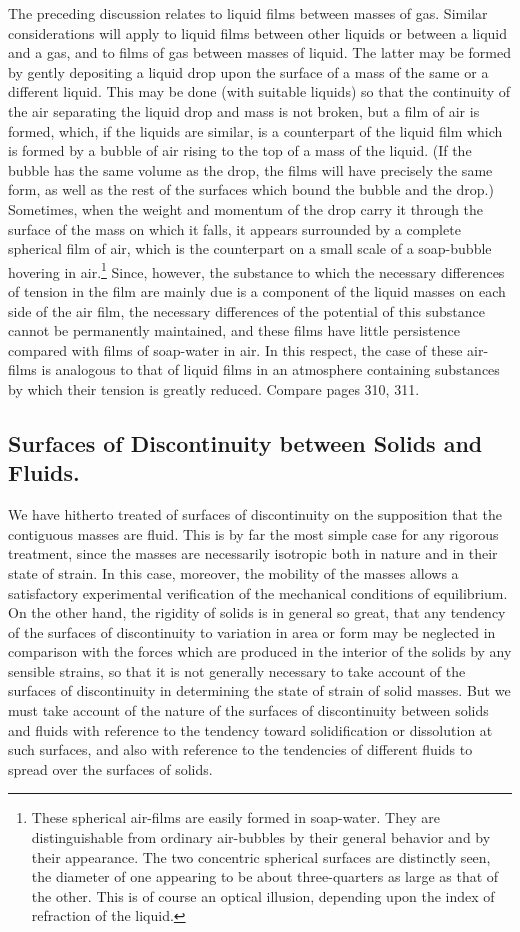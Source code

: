 \documentclass[12pt]{article}
\begin{document}
The preceding discussion relates to liquid films between masses of gas. Similar considerations will apply to liquid films between other liquids or between a liquid and a gas, and to films of gas between masses of liquid. The latter may be formed by gently depositing a liquid drop upon the surface of a mass of the same or a different liquid. This may be done (with suitable liquids) so that the continuity of the air separating the liquid drop and mass is not broken, but a film of air is formed, which, if the liquids are similar, is a counterpart of the liquid film which is formed by a bubble of air rising to the top of a mass of the liquid. (If the bubble has the same volume as the drop, the films will have precisely the same form, as well as the rest of the surfaces which bound the bubble and the drop.) Sometimes, when the weight and momentum of the drop carry it through the surface of the mass on which it falls, it appears surrounded by a complete spherical film of air, which is the counterpart on a small scale of a soap-bubble hovering in air.\footnote{These spherical air-films are easily formed in soap-water. They are distinguishable from ordinary air-bubbles by their general behavior and by their appearance. The two concentric spherical surfaces are distinctly seen, the diameter of one appearing to be about three-quarters as large as that of the other. This is of course an optical illusion, depending upon the index of refraction of the liquid.} Since, however, the substance to which the necessary differences of tension in the film are mainly due is a component of the liquid masses on each side of the air film, the necessary differences of the potential of this substance cannot be permanently maintained, and these films have little persistence compared with films of soap-water in air. In this respect, the case of these air-films is analogous to that of liquid films in an atmosphere containing substances by which their tension is greatly reduced. Compare pages 310, 311.
\subsection{Surfaces of Discontinuity between Solids and Fluids.}
We have hitherto treated of surfaces of discontinuity on the supposition that the contiguous masses are fluid. This is by far the most simple case for any rigorous treatment, since the masses are necessarily isotropic both in nature and in their state of strain. In this case, moreover, the mobility of the masses allows a satisfactory experimental verification of the mechanical conditions of equilibrium. On the other hand, the rigidity of solids is in general so great, that any tendency of the surfaces of discontinuity to variation in area or form may be neglected in comparison with the forces which are produced in the interior of the solids by any sensible strains, so that it is not generally necessary to take account of the surfaces of discontinuity in determining the state of strain of solid masses. But we must take account of the nature of the surfaces of discontinuity between solids and fluids with reference to the tendency toward solidification or dissolution at such surfaces, and also with reference to the tendencies of different fluids to spread over the surfaces of solids. 
\end{document}

